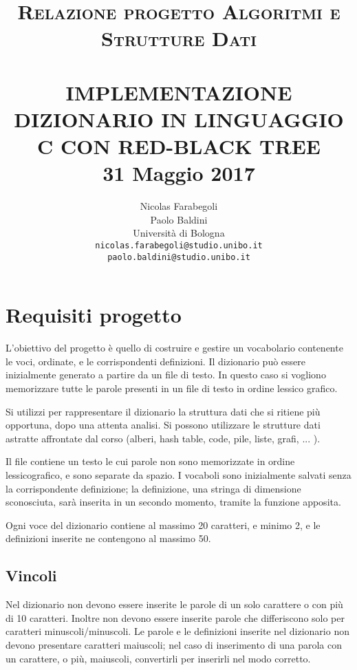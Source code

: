 \documentclass[paper=a4, fontsize=11pt,twoside]{scrartcl}   %
\title{ \normalsize \textsc{Relazione progetto Algoritmi e Strutture Dati}    %
	\\[2.0cm]                               %
	\HRule{0.5pt} \\                        %
	\LARGE \textbf{\uppercase{Implementazione dizionario in linguaggio 
			C con Red-Black Tree}}    %
	\HRule{2pt} \\ [0.5cm]      %
	\normalsize 31 Maggio 2017          %
}
\author{
	Nicolas Farabegoli\\
	Paolo Baldini\\
	Università di Bologna\\  
	\texttt{nicolas.farabegoli@studio.unibo.it} \\
	\texttt{paolo.baldini@studio.unibo.it}\\
}
\makeatletter
\def\printtitle{%
	{\centering \@title\par}}
\def\printauthor{%
	{\centering \large \@author}}
\makeatother
\begin{document}
	\thispagestyle{empty}       %
	
	\printtitle                 %
	\vfill
	\printauthor                %
	\newpage
	\tableofcontents
	\newpage
	\setcounter{page}{1}        %
	
	\section{Requisiti progetto}
		L'obiettivo del progetto è quello di costruire e gestire un vocabolario 
		contenente le voci, ordinate, e le corrispondenti definizioni. 
		Il dizionario può essere inizialmente generato a partire da un file di testo.  
		In questo caso si vogliono memorizzare tutte le parole presenti in un file di 
		testo in ordine lessico grafico.
		
		Si utilizzi per rappresentare il dizionario la struttura dati che si ritiene 
		più opportuna, dopo una attenta analisi. Si possono utilizzare le strutture 
		dati astratte affrontate dal corso (alberi, hash table, code, pile, liste, 
		grafi, ... ).
		
		Il file contiene un testo le cui parole non sono memorizzate in ordine lessicografico, e sono separate da spazio. I vocaboli sono inizialmente salvati senza la corrispondente definizione; la definizione, una stringa di dimensione sconosciuta, sarà inserita in un secondo momento, tramite la funzione apposita.
		
		Ogni voce del dizionario contiene al massimo 20 caratteri, e minimo 2, e le definizioni inserite ne contengono al massimo 50.
		
			\subsection{Vincoli}
				Nel dizionario non devono essere inserite le parole di un solo carattere o con più di 10 caratteri. Inoltre non devono essere inserite parole che differiscono solo per caratteri minuscoli/minuscoli. Le parole e le definizioni inserite nel dizionario non devono presentare caratteri maiuscoli; nel caso di inserimento di una parola con un carattere, o più, maiuscoli, convertirli per inserirli nel modo corretto. 
				
\end{document}
